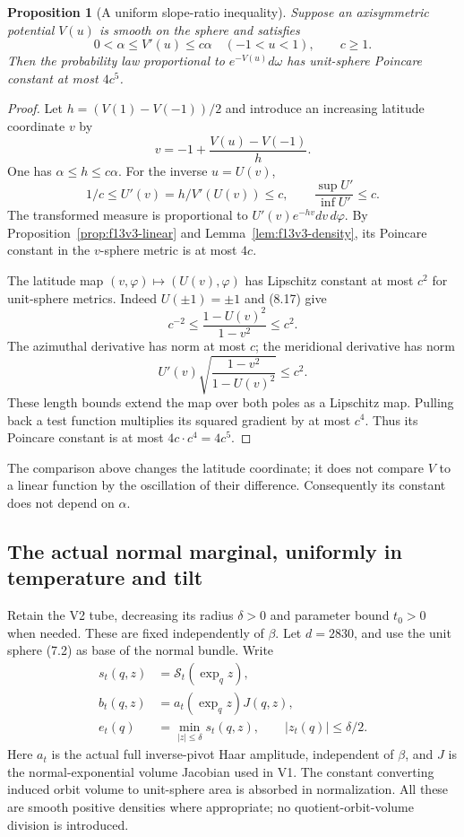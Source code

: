 \documentclass[11pt,oneside]{article}
\newtheorem{proposition}[theorem]{Proposition}
\newcommand{\cS}{\mathcal S}
\begin{document}
\begin{proposition}[A uniform slope-ratio inequality]
\label{prop:f13v3-slope}
Suppose an axisymmetric potential
\(V(u)\) is smooth on the sphere
and satisfies
\[
           0<\alpha\le V'(u)\le c\alpha
                         \quad(-1<u<1),\qquad c\ge1.
 \tag{8.15}
\]
Then the probability law
proportional to \(e^{-V(u)}d\omega\)
has unit-sphere Poincare
constant at most \(4c^5\).
\end{proposition}
\begin{proof}
Let \(h=(V(1)-V(-1))/2\) and
introduce an increasing
latitude coordinate \(v\) by
\[
             v=-1+\frac{V(u)-V(-1)}h .
 \tag{8.16}
\]
One has \(\alpha\le h\le c\alpha\).
For the inverse \(u=U(v)\),
\[
            1/c\le U'(v)=h/V'(U(v))\le c,
       \qquad \frac{\sup U'}{\inf U'}\le c .
 \tag{8.17}
\]
The transformed measure is
proportional to
\(U'(v)e^{-hv}dv\,d\varphi\).
By Proposition~\ref{prop:f13v3-linear}
and Lemma~\ref{lem:f13v3-density},
its Poincare constant in the
\(v\)-sphere metric is at
most \(4c\).

The latitude map
\((v,\varphi)\mapsto(U(v),\varphi)\)
has Lipschitz constant at most
\(c^2\) for unit-sphere metrics.
Indeed \(U(\pm1)=\pm1\) and
(8.17) give
\[
        c^{-2}\le\frac{1-U(v)^2}{1-v^2}\le c^2.
 \tag{8.18}
\]
The azimuthal derivative has
norm at most \(c\); the
meridional derivative has
norm
\[
                  U'(v)\sqrt{\frac{1-v^2}{1-U(v)^2}}\le c^2.
\]
These length bounds extend
the map over both poles as
a Lipschitz map. Pulling back
a test function multiplies
its squared gradient by at
most \(c^4\). Thus its
Poincare constant is at
most \(4c\cdot c^4=4c^5\).
\end{proof}

The comparison above changes
the latitude coordinate; it
does not compare \(V\) to
a linear function by the
oscillation of their difference.
Consequently its constant
does not depend on \(\alpha\).

\subsection{The actual normal marginal, uniformly in temperature and tilt}

Retain the V2 tube, decreasing
its radius \(\delta>0\) and
parameter bound \(t_0>0\) when
needed. These are fixed
independently of \(\beta\).
Let \(d=2830\), and use the
unit sphere (7.2) as base of
the normal bundle. Write
\[
 \begin{split}
 s_t(q,z)&=\cS_t(\exp_qz),\\
 b_t(q,z)&=a_t(\exp_qz)J(q,z),\\
 e_t(q)&=\min_{|z|\le\delta}s_t(q,z),
       \qquad |z_t(q)|\le\delta/2.
 \end{split}
 \tag{8.19}
\]
Here \(a_t\) is the actual
full inverse-pivot Haar
amplitude, independent of
\(\beta\), and \(J\) is the
normal-exponential volume
Jacobian used in V1.
The constant converting
induced orbit volume to
unit-sphere area is absorbed
in normalization. All these
are smooth positive densities
where appropriate; no
quotient-orbit-volume division
is introduced.
\end{document}
